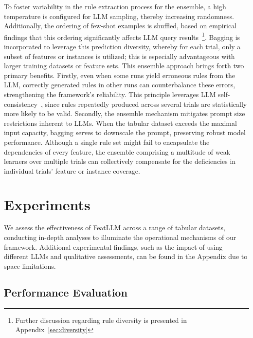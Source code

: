 To foster variability in the rule extraction process for the ensemble, a high temperature is configured for LLM sampling, thereby increasing randomness. Additionally, the ordering of few-shot examples is shuffled, based on empirical findings that this ordering significantly affects LLM query results~\cite{lu2022fantastically}\footnote{Further discussion regarding rule diversity is presented in Appendix~\ref{sec:diversity}}. Bagging is incorporated to leverage this prediction diversity, whereby for each trial, only a subset of features or instances is utilized; this is especially advantageous with larger training datasets or feature sets. This ensemble approach brings forth two primary benefits. Firstly, even when some runs yield erroneous rules from the LLM, correctly generated rules in other runs can counterbalance these errors, strengthening the framework’s reliability. This principle leverages LLM self-consistency~\cite{wang2022self}, since rules repeatedly produced across several trials are statistically more likely to be valid. Secondly, the ensemble mechanism mitigates prompt size restrictions inherent to LLMs. When the tabular dataset exceeds the maximal input capacity, bagging serves to downscale the prompt, preserving robust model performance. Although a single rule set might fail to encapsulate the dependencies of every feature, the ensemble comprising a multitude of weak learners over multiple trials can collectively compensate for the deficiencies in individual trials' feature or instance coverage.

\section{Experiments}
We assess the effectiveness of \textsf{FeatLLM} across a range of tabular datasets, conducting in-depth analyses to illuminate the operational mechanisms of our framework. Additional experimental findings, such as the impact of using different LLMs and qualitative assessments, can be found in the Appendix due to space limitations.

\subsection{Performance Evaluation}
